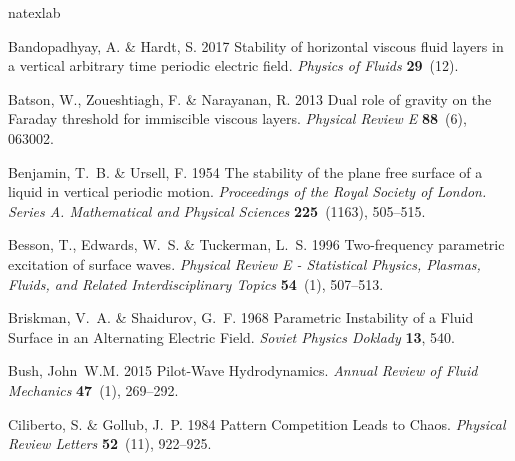 \documentclass{jfm_arxiv}
\begin{document}

%


\begin{thebibliography}{49}
\expandafter\ifx\csname natexlab\endcsname\relax\def\natexlab#1{#1}\fi
\def\au#1{#1} \def\ed#1{#1} \def\yr#1{#1}\def\at#1{#1}\def\jt#1{\textit{#1}}
  \def\bt#1{#1}\def\bvol#1{\textbf{#1}} \def\vol#1{#1} \def\pg#1{#1}
  \def\publ#1{#1}\def\arxiv#1{#1}\def\org#1{#1}\def\st#1{\textit{#1}}

{\sc \au{Bandopadhyay, A.} \& \au{Hardt, S.}} \yr{2017}  \at{{Stability of
  horizontal viscous fluid layers in a vertical arbitrary time periodic
  electric field}}.  \jt{Physics of Fluids}  \bvol{29}~(12).

{\sc \au{Batson, W.}, \au{Zoueshtiagh, F.} \& \au{Narayanan, R.}} \yr{2013}
  \at{{Dual role of gravity on the Faraday threshold for immiscible viscous
  layers}}.  \jt{Physical Review E}  \bvol{88}~(6),  \pg{063002}.

{\sc \au{Benjamin, T.~B.} \& \au{Ursell, F.}} \yr{1954}  \at{{The stability of
  the plane free surface of a liquid in vertical periodic motion}}.
  \jt{Proceedings of the Royal Society of London. Series A. Mathematical and
  Physical Sciences}  \bvol{225}~(1163),  \pg{505--515}.

{\sc \au{Besson, T.}, \au{Edwards, W.~S.} \& \au{Tuckerman, L.~S.}} \yr{1996}
  \at{{Two-frequency parametric excitation of surface waves}}.  \jt{Physical
  Review E - Statistical Physics, Plasmas, Fluids, and Related
  Interdisciplinary Topics}  \bvol{54}~(1),  \pg{507--513}.

{\sc \au{Briskman, V.~A.} \& \au{Shaidurov, G.~F.}} \yr{1968}  \at{{Parametric
  Instability of a Fluid Surface in an Alternating Electric Field}}.
  \jt{Soviet Physics Doklady}  \bvol{13},  \pg{540}.

{\sc \au{Bush, John~W.M.}} \yr{2015}  \at{{Pilot-Wave Hydrodynamics}}.
  \jt{Annual Review of Fluid Mechanics}  \bvol{47}~(1),  \pg{269--292}.

{\sc \au{Ciliberto, S.} \& \au{Gollub, J.~P.}} \yr{1984}  \at{{Pattern
  Competition Leads to Chaos}}.  \jt{Physical Review Letters}  \bvol{52}~(11),
  \pg{922--925}.


\end{thebibliography}
\end{document}
